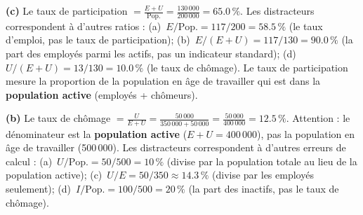 
\begin{reponse}
\textbf{(c)} Le taux de participation $= \frac{E + U}{\text{Pop.}} = \frac{130\,000}{200\,000} = 65.0\,\%$. Les distracteurs correspondent à d'autres ratios : (a)~$E/\text{Pop.} = 117/200 = 58.5\,\%$ (le taux d'emploi, pas le taux de participation); (b)~$E/(E+U) = 117/130 = 90.0\,\%$ (la part des employés parmi les actifs, pas un indicateur standard); (d)~$U/(E+U) = 13/130 = 10.0\,\%$ (le taux de chômage). Le taux de participation mesure la proportion de la population en âge de travailler qui est dans la \textbf{population active} (employés + chômeurs).
\end{reponse}


\begin{reponse}
\textbf{(b)} Le taux de chômage $= \frac{U}{E + U} = \frac{50\,000}{350\,000 + 50\,000} = \frac{50\,000}{400\,000} = 12.5\,\%$. Attention : le dénominateur est la \textbf{population active} ($E + U = 400\,000$), pas la population en âge de travailler (500\,000). Les distracteurs correspondent à d'autres erreurs de calcul : (a)~$U/\text{Pop.} = 50/500 = 10\,\%$ (divise par la population totale au lieu de la population active); (c)~$U/E = 50/350 \approx 14.3\,\%$ (divise par les employés seulement); (d)~$I/\text{Pop.} = 100/500 = 20\,\%$ (la part des inactifs, pas le taux de chômage).
\end{reponse}


